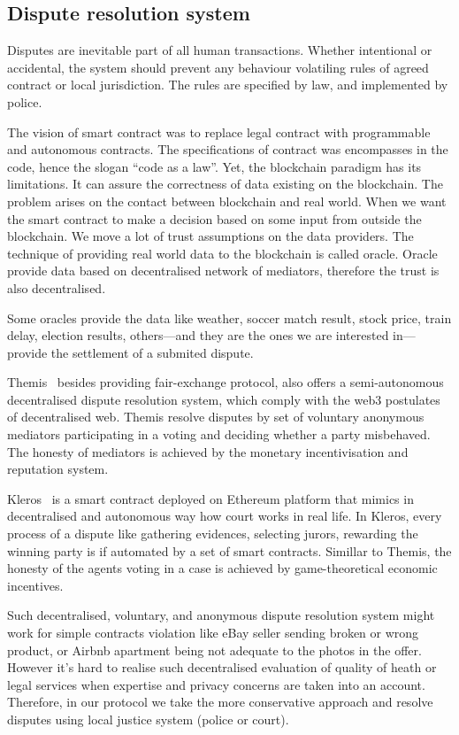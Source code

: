 \documentclass{ieeeaccess}
\begin{document}
\subsection{Dispute resolution system}

Disputes are inevitable part of all human transactions. Whether
intentional or accidental, the system should prevent any behaviour
volatiling rules of agreed contract or local jurisdiction. The rules are
specified by law, and implemented by police.

The vision of smart contract was to replace legal contract with
programmable and autonomous contracts. The specifications of contract
was encompasses in the code, hence the slogan ``code as a law''. Yet,
the blockchain paradigm has its limitations. It can assure the
correctness of data existing on the blockchain. The problem arises on
the contact between blockchain and real world. When we want the smart
contract to make a decision based on some input from outside the
blockchain. We move a lot of trust assumptions on the data providers.
The technique of providing real world data to the blockchain is called
oracle. Oracle provide data based on decentralised network of mediators,
therefore the trust is also decentralised.

Some oracles provide the data like weather, soccer match result, stock
price, train delay, election results, others---and they are the ones we
are interested in---provide the settlement of a submited dispute.


Themis~\cite{meng2019themis} besides providing fair-exchange protocol,
also offers a semi-autonomous decentralised dispute resolution system,
which comply with the web3 postulates of decentralised web. Themis
resolve disputes by set of voluntary anonymous mediators participating
in a voting and deciding whether a party misbehaved. The honesty of
mediators is achieved by the monetary incentivisation and reputation
system.

Kleros~\cite{lesaege2018kleros} is a smart contract deployed on
Ethereum platform that mimics in decentralised and autonomous way how
court works in real life. In Kleros, every process of a dispute like
gathering evidences, selecting jurors, rewarding the winning party is if
automated by a set of smart contracts. Simillar to Themis, the honesty
of the agents voting in a case is achieved by game-theoretical economic
incentives.

Such decentralised, voluntary, and anonymous dispute resolution system
might work for simple contracts violation like eBay seller sending
broken or wrong product, or Airbnb apartment being not adequate to the
photos in the offer. However it's hard to realise such decentralised
evaluation of quality of heath or legal services when expertise and
privacy concerns are taken into an account. Therefore, in our protocol
we take the more conservative approach and resolve disputes using local
justice system (police or court).
\end{document}
